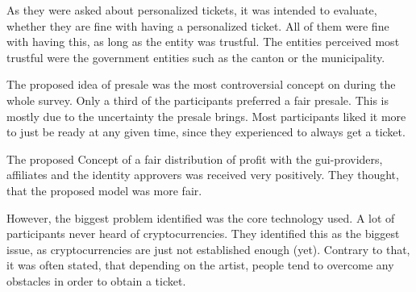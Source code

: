As they were asked about personalized tickets, it was intended to evaluate, whether they are fine with having a personalized ticket. All of them were fine with having this, as long as the entity was trustful. The entities perceived most trustful were the government entities such as the canton or the municipality. 

The proposed idea of presale was the most controversial concept on during the whole survey. Only a third of the participants preferred a fair presale. This is mostly due to the uncertainty the presale brings. Most participants liked it more to just be ready at any given time, since they experienced to always get a ticket. 

The proposed Concept of a fair distribution of profit with the gui-providers, affiliates and the identity approvers was received very positively. They thought, that the proposed model was more fair. 

However, the biggest problem identified was the core technology used. A lot of participants never heard of cryptocurrencies. They identified this as the biggest issue, as cryptocurrencies are just not established enough (yet). Contrary to that, it was often stated, that depending on the artist, people tend to overcome any obstacles in order to obtain a ticket.




